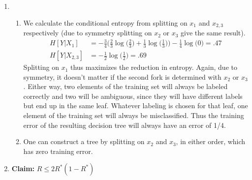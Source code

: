 \documentclass[11pt,letter]{article}
\begin{document}
\begin{enumerate}
    \item \begin{enumerate}
        \item We calculate the conditional entropy from splitting on $x_1$ and $x_{2,3}$ respectively (due to symmetry splitting on $x_2$ or $x_3$ give the same result).
        \begin{align*}
            H[Y \vert X_1] & = -\frac{3}{4}\Big(\frac{2}{3}\log \big( \frac{2}{3}\big) + \frac{1}{3}\log \big( \frac{1}{3}\big) \Big) - \frac{1}{4} \log \big( 0 \big) = .47 \\
            H[Y \vert X_{2,3}] & = -\frac{1}{2}\log \big( \frac{1}{2}\big) = .69
        \end{align*}
        Splitting on $x_1$ thus maximizes the reduction in entropy.
        Again, due to symmetry, it doesn't matter if the second fork is determined with $x_2$ or $x_3$.
        Either way, two elements of the training set will always be labeled correctly and two will be ambiguous, since they will have different labels but end up in the same leaf.
        Whatever labeling is chosen for that leaf, one element of the training set will always be misclassified.
        Thus the training error of the resulting decision tree will always have an error of 1/4.
        \item One can construct a tree by splitting on $x_2$ and $x_3$, in either order, which has zero training error.
    \end{enumerate}

    \item \textbf{Claim:} $R \le 2R^*(1-R^*)$
    

\end{enumerate}
\end{document}
